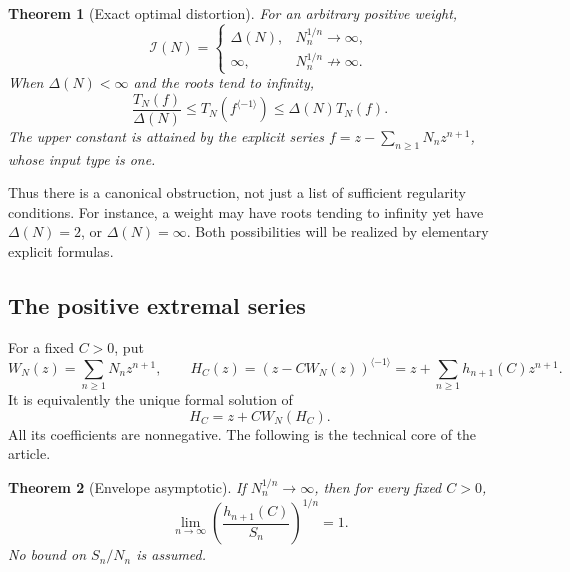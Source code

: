 \documentclass[11pt,a4paper]{article}
\numberwithin{equation}{section}
\newtheorem{theorem}{Theorem}[section]
\theoremstyle{definition}
\theoremstyle{remark}
\newcommand{\Type}{T_N}
\newcommand{\inv}[1]{#1^{\langle-1\rangle}}
\begin{document}
\begin{theorem}[Exact optimal distortion]
\label{thm:distortionintro}
For an arbitrary positive weight,
\begin{equation}
 \mathcal I(N)=
 \begin{cases}
 \Delta(N),&N_n^{1/n}\to\infty,\\
 \infty,&N_n^{1/n}\not\to\infty.
 \end{cases}
 \label{eq:optimaldistortion}
\end{equation}
When $\Delta(N)<\infty$ and the roots tend to infinity,
\begin{equation}
 \frac{\Type(f)}{\Delta(N)}\le\Type(\inv f)
             \le\Delta(N)\Type(f).
 \label{eq:twosideddistortion}
\end{equation}
The upper constant is attained by the explicit series
$f=z-\sum_{n\ge1}N_nz^{n+1}$, whose input type is one.
\end{theorem}

Thus there is a canonical obstruction, not just a list of sufficient
regularity conditions. For instance, a weight may have roots tending to
infinity yet have $\Delta(N)=2$, or $\Delta(N)=\infty$. Both possibilities
will be realized by elementary explicit formulas.

\subsection{The positive extremal series}

For a fixed $C>0$, put
\begin{equation}
 W_N(z)=\sum_{n\ge1}N_nz^{n+1},\qquad
 H_C(z)=\inv{(z-CW_N(z))}
       =z+\sum_{n\ge1}h_{n+1}(C)z^{n+1}.
 \label{eq:positiveinverse}
\end{equation}
It is equivalently the unique formal solution of
\begin{equation}
 H_C=z+C W_N(H_C).
 \label{eq:fixedpoint}
\end{equation}
All its coefficients are nonnegative. The following is the technical
core of the article.

\begin{theorem}[Envelope asymptotic]
\label{thm:envelopeintro}
If $N_n^{1/n}\to\infty$, then for every fixed $C>0$,
\begin{equation}
 \boxed{\displaystyle
 \lim_{n\to\infty}\left(\frac{h_{n+1}(C)}{S_n}\right)^{1/n}=1.}
 \label{eq:central}
\end{equation}
No bound on $S_n/N_n$ is assumed.
\end{theorem}
\end{document}

